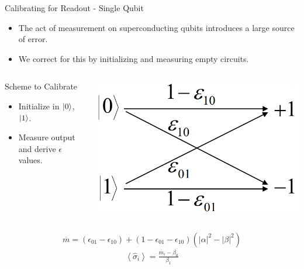 \begin{frame}{Calibrating for Readout - Single Qubit}
  \begin{itemize}
    \item The act of measurement on superconducting qubits introduces a large
source of error.
    \item We correct for this by initializing and measuring empty circuits.
  \end{itemize}

\begin{columns}
  \begin{block}{Scheme to Calibrate}
    \begin{itemize}
    \item Initialize in $\ket{0}$, $\ket{1}$.
    \item Measure output and derive $\epsilon$ values.
    \end{itemize}
  \end{block}

  \includegraphics[width=\textwidth]{images/bit_flip_calibration.png}
\end{columns}

\begin{equation*}
  \overline{m}=\left(\epsilon_{01}-\epsilon_{10}\right)
  +\left(1-\epsilon_{01}-\epsilon_{10}\right)\left(\left|\alpha\right|^2
    -\left|\beta\right|^2\right)
\end{equation*}
\begin{equation}
  \begin{split}
    \left\langle \hat{\sigma}_i\right\rangle=
    \frac{\overline{m}_i-\beta_0}{\beta_1}
  \end{split}
\end{equation}
\end{frame}

